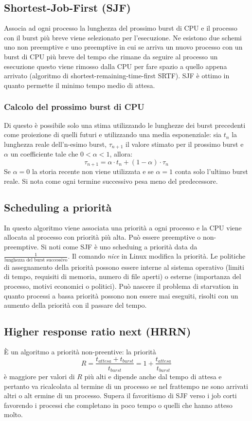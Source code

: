 \subsection{Shortest-Job-First (SJF)}
Associa ad ogni processo la lunghezza del prossimo burst di CPU e il processo con il burst pi\`u breve viene selezionato per l'esecuzione. Ne esistono due schemi uno non preemptive e uno
preemptive in cui se arriva un nuovo processo con un burst di CPU pi\`u breve del tempo che rimane da seguire al processo un esecuzione questo viene rimosso dalla CPU per fare spazio
a quello appena arrivato (algoritmo di shortest-remaining-time-first SRTF). SJF \`e ottimo in quanto permette il minimo tempo medio di attesa. 
\subsubsection{Calcolo del prossimo burst di CPU}
Di questo \`e possibile solo una stima utilizzando le lunghezze dei burst precedenti come proiezione di quelli futuri e utilizzando una media esponenziale: sia $t_n$ la lunghezza reale
dell'n-esimo burst, $\tau_{n+1}$ il valore stimato per il prossimo burst e $\alpha$ un coefficiente tale che $0<\alpha<1$, allora: 
$$\tau_{n+1} = \alpha\cdot t_n + (1-\alpha)\cdot \tau_n$$
Se $\alpha = 0$ la storia recente non viene utilizzata e se $\alpha = 1$ conta solo l'ultimo burst reale. Si nota come ogni termine successivo pesa meno del predecessore.
\subsection{Scheduling a priorit\`a}
In questo algoritmo viene associata una priorit\`a a ogni processo e la CPU viene allocata al processo con priorit\`a pi\`u alta. Pu\`o essere preemptive o non-preemptive. Si noti
come SJF \`e uno scheduing a priorit\`a data da $\frac{1}{\text{lunghezza del burst successivo}}$. Il comando \emph{nice} in Linux modifica la priorit\`a. Le politiche di assegnamento
della priorit\`a possono essere interne al sistema operativo (limiti di tempo, requisiti di memoria, numero di file aperti) o esterne (importanza del processo, motivi economici o 
politici). Pu\`o nascere il problema di starvation in quanto processi a bassa priorit\`a possono non essere mai eseguiti, risolti con un aumento della priorit\`a con il passare del
tempo. 
\subsection{Higher response ratio next (HRRN)}
\`E un algoritmo a priorit\`a non-preentive: la priorit\`a $$R=\frac{t_{attesa} + t_{burst}}{t_{burst}} = 1 + \frac{t_{attesa}}{t_{burst}}$$ \`e maggiore per valori di $R$ pi\`u alti e
dipende anche dal tempo di attesa e pertanto va ricalcolata al termine di un processo se nel frattempo ne sono arrivati altri o alt ermine di un processo. Supera il favoritismo di SJF
verso i job corti favorendo i processi che completano in poco tempo o quelli che hanno atteso molto. 
